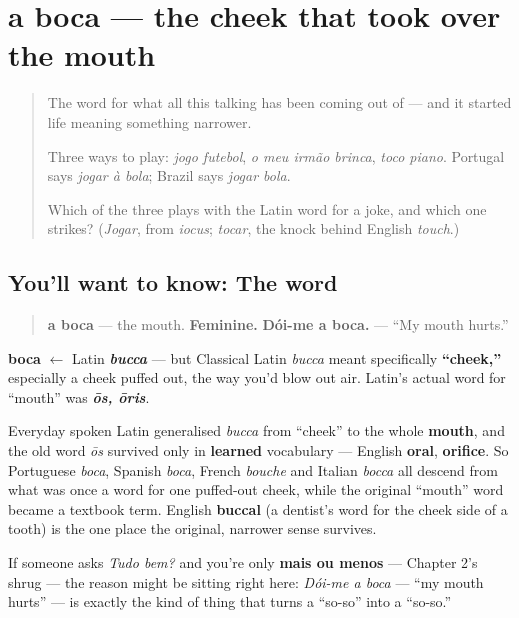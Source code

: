 \section[a boca]{a boca — the cheek that took over the mouth}

\label{lesson:PT-C26-boca}



\begin{quote}
The word for what all this talking has been coming out of — and it started life meaning something narrower.

Three ways to play: \emph{jogo futebol}, \emph{o meu irmão brinca}, \emph{toco piano}. Portugal says \emph{jogar à bola}; Brazil says \emph{jogar bola}.

Which of the three plays with the Latin word for a joke, and which one strikes? (\emph{Jogar}, from \emph{iocus}; \emph{tocar}, the knock behind English \emph{touch}.)
\end{quote}

\subsection*{You'll want to know: The word}
\begin{quote}
\textbf{a boca} — the mouth. \textbf{Feminine.} \textbf{Dói-me a boca.} — \textquotedblleft{}My mouth hurts.\textquotedblright{}
\end{quote}

\begin{cousinweb}
\textbf{boca} $\leftarrow$ Latin \emph{\textbf{bucca}} — but Classical Latin \emph{bucca} meant specifically \textbf{\textquotedblleft{}cheek,\textquotedblright{}} especially a cheek puffed out, the way you'd blow out air. Latin's actual word for \textquotedblleft{}mouth\textquotedblright{} was \emph{\textbf{ōs, ōris}}.

Everyday spoken Latin generalised \emph{bucca} from \textquotedblleft{}cheek\textquotedblright{} to the whole \textbf{mouth}, and the old word \emph{ōs} survived only in \textbf{learned} vocabulary — English \textbf{oral}, \textbf{orifice}. So Portuguese \emph{boca}, Spanish \emph{boca}, French \emph{bouche} and Italian \emph{bocca} all descend from what was once a word for one puffed-out cheek, while the original \textquotedblleft{}mouth\textquotedblright{} word became a textbook term. English \textbf{buccal} (a dentist's word for the cheek side of a tooth) is the one place the original, narrower sense survives.

If someone asks \emph{Tudo bem?} and you're only \textbf{mais ou menos} — Chapter 2's shrug — the reason might be sitting right here: \emph{Dói-me a boca} — \textquotedblleft{}my mouth hurts\textquotedblright{} — is exactly the kind of thing that turns a \textquotedblleft{}so-so\textquotedblright{} into a \textquotedblleft{}so-so.\textquotedblright{}
\end{cousinweb}

